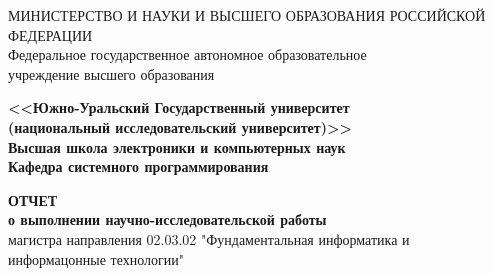\begin{titlepage}
    \begin{center}
        МИНИСТЕРСТВО И НАУКИ И ВЫСШЕГО ОБРАЗОВАНИЯ РОССИЙСКОЙ ФЕДЕРАЦИИ\\
        Федеральное государственное автономное образовательное\\
        учреждение высшего образования

        \textbf{
        <<Южно-Уральский Государственный университет\\
        (национальный исследовательский университет)>>\\
        Высшая школа электроники и компьютерных наук\\
        Кафедра системного программирования
        }
        \bigskip
        

        \vfill
        \large\textbf{
            ОТЧЕТ\\
            о выполнении научно-исследовательской работы
        }\\
        магистра направления 
        02.03.02 "Фундаментальная информатика и информацонные технологии"
        \bigskip
        

\end{center}
\end{titlepage}
